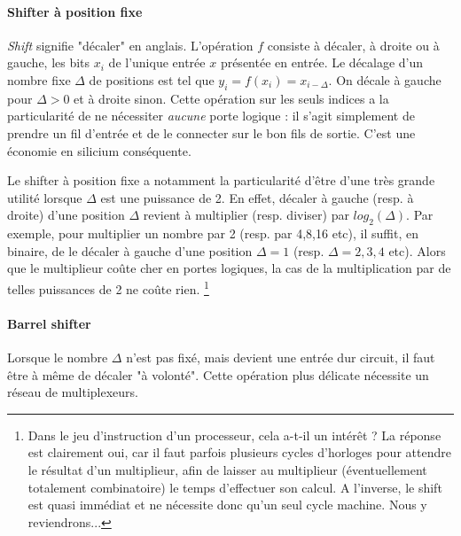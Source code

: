 \paragraph{Shifter à position fixe}
{\it Shift} signifie "décaler" en anglais. L'opération $f$ consiste à décaler, à droite ou à gauche, les bits $x_i$ de l'unique entrée $x$ présentée en entrée.
Le décalage d'un nombre fixe $\Delta$ de positions est tel que $y_i=f(x_i)=x_{i-\Delta}$. On décale à gauche pour $\Delta>0$ et à droite sinon. Cette opération sur
les seuls indices a la particularité de ne nécessiter {\it aucune} porte logique : il s'agit simplement de prendre un fil d'entrée et
de le connecter sur le bon fils de sortie. C'est une économie en silicium conséquente.

Le shifter à position fixe a notamment la particularité d'être d'une très grande utilité lorsque $\Delta$ est une puissance de 2. En effet,
décaler à gauche (resp. à droite) d'une position $\Delta$ revient à multiplier (resp. diviser) par $log_2(\Delta)$. Par exemple,
pour multiplier un nombre par 2 (resp. par 4,8,16 etc), il suffit, en binaire, de le décaler à gauche d'une position $\Delta=1$ (resp. $\Delta=2,3,4$ etc).
Alors que le multiplieur coûte cher en portes logiques, la cas de la multiplication par de telles puissances de 2 ne coûte rien.
\footnote{Dans le jeu d'instruction d'un processeur, cela a-t-il un intérêt ? La réponse est clairement oui, car il faut parfois plusieurs cycles d'horloges
pour attendre le résultat d'un multiplieur, afin de laisser au multiplieur (éventuellement totalement combinatoire) le temps d'effectuer son calcul.
A l'inverse, le shift est quasi immédiat et ne nécessite donc qu'un seul cycle machine. Nous y reviendrons...}

\paragraph{Barrel shifter}
Lorsque le nombre $\Delta$ n'est pas fixé, mais devient une entrée dur circuit, il faut être à même de décaler "à volonté".
Cette opération plus délicate nécessite un réseau de multiplexeurs.

